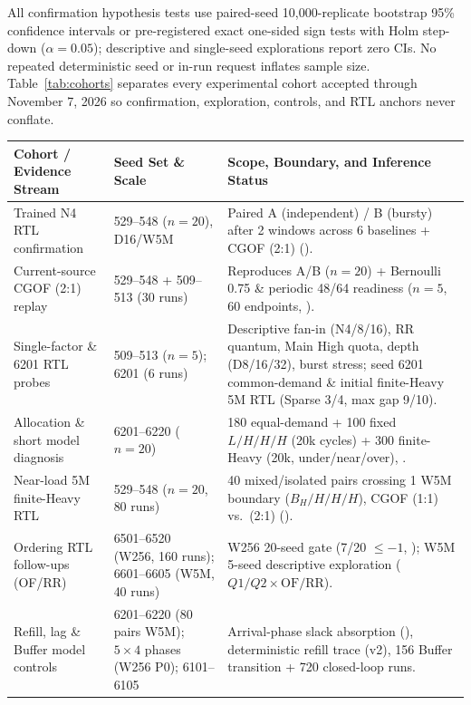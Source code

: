 All confirmation hypothesis tests use paired-seed 10,000-replicate bootstrap 95\% confidence intervals or pre-registered exact one-sided sign tests with Holm step-down ($\alpha=0.05$); descriptive and single-seed explorations report zero CIs. No repeated deterministic seed or in-run request inflates sample size. Table~\ref{tab:cohorts} separates every experimental cohort accepted through November 7, 2026 so confirmation, exploration,  controls, and RTL anchors never conflate.

\begin{table}[t]
\centering\footnotesize
\setlength{\tabcolsep}{4pt}
\begin{tabular}{@{}P{.27\textwidth}P{.22\textwidth}P{.47\textwidth}@{}}
\toprule
Cohort / Evidence Stream & Seed Set \& Scale & Scope, Boundary, and Inference Status \\
\midrule
Trained N4 RTL confirmation & 529--548 ($n=20$), D16/W5M & Paired A (independent) / B (bursty) after 2 windows across 6 baselines + CGOF (2:1) (). \\
Current-source CGOF (2:1) replay & 529--548 + 509--513 (30 runs) & Reproduces A/B ($n=20$) + Bernoulli 0.75 \& periodic 48/64 readiness ($n=5$, 60 endpoints, ). \\
Single-factor \& 6201 RTL probes & 509--513 ($n=5$); 6201 (6 runs) & Descriptive fan-in (N4/8/16), RR quantum, Main High quota, depth (D8/16/32), burst stress; seed 6201 common-demand \& initial finite-Heavy 5M RTL (Sparse 3/4, max gap 9/10). \\
Allocation \& short model diagnosis & 6201--6220 ($n=20$) & 180 equal-demand + 100 fixed $L/H/H/H$ (20k cycles) + 300 finite-Heavy (20k, under/near/over), . \\
Near-load 5M finite-Heavy RTL & 529--548 ($n=20$, 80 runs) & 40 mixed/isolated pairs crossing 1 W5M boundary ($B_H/H/H/H$), CGOF (1:1) vs.\ (2:1) (). \\
Ordering RTL follow-ups (OF/RR) & 6501--6520 (W256, 160 runs); 6601--6605 (W5M, 40 runs) & W256 20-seed gate (7/20 $\le -1$, ); W5M 5-seed descriptive exploration ($Q1/Q2\times\mathrm{OF}/\mathrm{RR}$). \\
Refill, lag \& Buffer model controls & 6201--6220 (80 pairs W5M); $5\times 4$ phases (W256 P0); 6101--6105 & Arrival-phase slack absorption (), deterministic refill trace (v2), 156 Buffer transition + 720 closed-loop runs. \\

\end{tabular}
\end{table}
